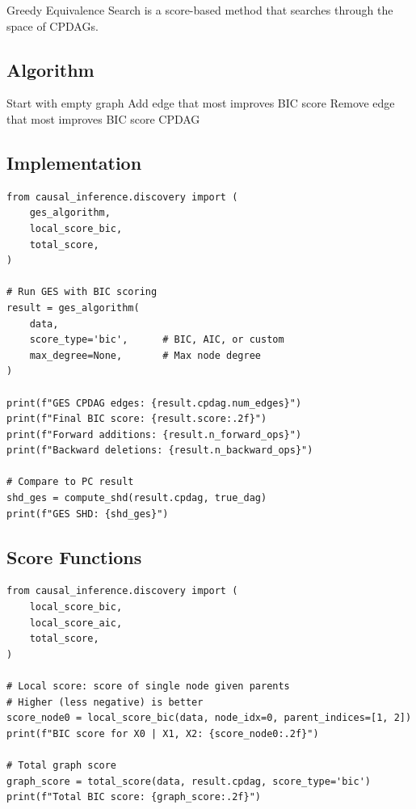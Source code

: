 Greedy Equivalence Search \citep{chickering2002optimal} is a score-based method that searches through the space of CPDAGs.

\subsection{Algorithm}

\begin{algorithm}
\caption{GES (Greedy Equivalence Search)}
\begin{algorithmic}[1]
\STATE Start with empty graph
\REPEAT {}
    \STATE Add edge that most improves BIC score
\REPEAT {}
    \STATE Remove edge that most improves BIC score
\RETURN CPDAG
\end{algorithmic}
\end{algorithm}

\subsection{Implementation}

\begin{verbatim}
from causal_inference.discovery import (
    ges_algorithm,
    local_score_bic,
    total_score,
)

# Run GES with BIC scoring
result = ges_algorithm(
    data,
    score_type='bic',      # BIC, AIC, or custom
    max_degree=None,       # Max node degree
)

print(f"GES CPDAG edges: {result.cpdag.num_edges}")
print(f"Final BIC score: {result.score:.2f}")
print(f"Forward additions: {result.n_forward_ops}")
print(f"Backward deletions: {result.n_backward_ops}")

# Compare to PC result
shd_ges = compute_shd(result.cpdag, true_dag)
print(f"GES SHD: {shd_ges}")
\end{verbatim}

\subsection{Score Functions}

\begin{verbatim}
from causal_inference.discovery import (
    local_score_bic,
    local_score_aic,
    total_score,
)

# Local score: score of single node given parents
# Higher (less negative) is better
score_node0 = local_score_bic(data, node_idx=0, parent_indices=[1, 2])
print(f"BIC score for X0 | X1, X2: {score_node0:.2f}")

# Total graph score
graph_score = total_score(data, result.cpdag, score_type='bic')
print(f"Total BIC score: {graph_score:.2f}")
\end{verbatim}



